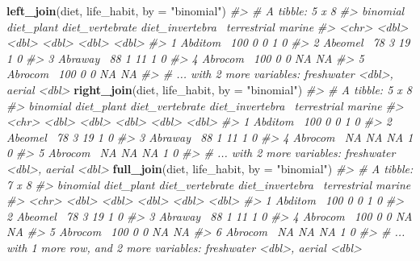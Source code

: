 \documentclass[]{book}
\newenvironment{Shaded}{}{}
\newcommand{\CommentTok}[1]{\textcolor[rgb]{0.38,0.63,0.69}{\textit{#1}}}
\newcommand{\DataTypeTok}[1]{\textcolor[rgb]{0.56,0.13,0.00}{#1}}
\newcommand{\KeywordTok}[1]{\textcolor[rgb]{0.00,0.44,0.13}{\textbf{#1}}}
\newcommand{\NormalTok}[1]{#1}
\newcommand{\StringTok}[1]{\textcolor[rgb]{0.25,0.44,0.63}{#1}}
\begin{document}
\begin{Shaded}
\begin{Highlighting}[]
\KeywordTok{left_join}\NormalTok{(diet, life_habit, }\DataTypeTok{by =} \StringTok{"binomial"}\NormalTok{)}
\CommentTok{#> # A tibble: 5 x 8}
\CommentTok{#>   binomial diet_plant diet_vertebrate diet_invertebra~ terrestrial marine}
\CommentTok{#>   <chr>         <dbl>           <dbl>            <dbl>       <dbl>  <dbl>}
\CommentTok{#> 1 Abditom~        100               0                0           1      0}
\CommentTok{#> 2 Abeomel~         78               3               19           1      0}
\CommentTok{#> 3 Abraway~         88               1               11           1      0}
\CommentTok{#> 4 Abrocom~        100               0                0          NA     NA}
\CommentTok{#> 5 Abrocom~        100               0                0          NA     NA}
\CommentTok{#> # ... with 2 more variables: freshwater <dbl>, aerial <dbl>}
\KeywordTok{right_join}\NormalTok{(diet, life_habit, }\DataTypeTok{by =} \StringTok{"binomial"}\NormalTok{)}
\CommentTok{#> # A tibble: 5 x 8}
\CommentTok{#>   binomial diet_plant diet_vertebrate diet_invertebra~ terrestrial marine}
\CommentTok{#>   <chr>         <dbl>           <dbl>            <dbl>       <dbl>  <dbl>}
\CommentTok{#> 1 Abditom~        100               0                0           1      0}
\CommentTok{#> 2 Abeomel~         78               3               19           1      0}
\CommentTok{#> 3 Abraway~         88               1               11           1      0}
\CommentTok{#> 4 Abrocom~         NA              NA               NA           1      0}
\CommentTok{#> 5 Abrocom~         NA              NA               NA           1      0}
\CommentTok{#> # ... with 2 more variables: freshwater <dbl>, aerial <dbl>}
\KeywordTok{full_join}\NormalTok{(diet, life_habit, }\DataTypeTok{by =} \StringTok{"binomial"}\NormalTok{)}
\CommentTok{#> # A tibble: 7 x 8}
\CommentTok{#>   binomial diet_plant diet_vertebrate diet_invertebra~ terrestrial marine}
\CommentTok{#>   <chr>         <dbl>           <dbl>            <dbl>       <dbl>  <dbl>}
\CommentTok{#> 1 Abditom~        100               0                0           1      0}
\CommentTok{#> 2 Abeomel~         78               3               19           1      0}
\CommentTok{#> 3 Abraway~         88               1               11           1      0}
\CommentTok{#> 4 Abrocom~        100               0                0          NA     NA}
\CommentTok{#> 5 Abrocom~        100               0                0          NA     NA}
\CommentTok{#> 6 Abrocom~         NA              NA               NA           1      0}
\CommentTok{#> # ... with 1 more row, and 2 more variables: freshwater <dbl>, aerial <dbl>}


\end{Highlighting}
\end{Shaded}
\end{document}
